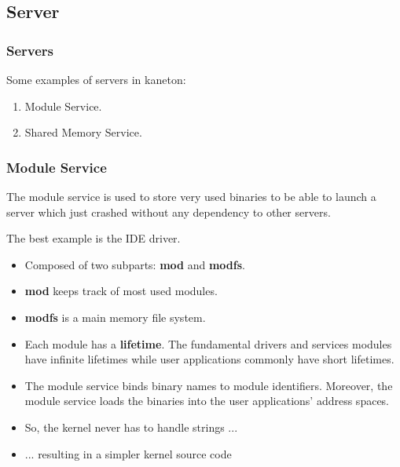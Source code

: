 %
%

\subsection{Server}


\begin{frame}
  \frametitle{Servers}

  Some examples of servers in kaneton:

  \begin{enumerate}[<+->]
    \item
      Module Service.
    \item
      Shared Memory Service.
  \end{enumerate}
\end{frame}


\begin{frame}
  \frametitle{Module Service}

  The module service is used to store very used binaries to be able to
  launch a server which just crashed without any dependency to other servers.

  \-

  The best example is the IDE driver.

  \-

  \begin{itemize}[<+->]
    \item
      Composed of two subparts: \textbf{mod} and \textbf{modfs}.
    \item
      \textbf{mod} keeps track of most used modules.
    \item
      \textbf{modfs} is a main memory file system.
    \item
      Each module has a \textbf{lifetime}. The fundamental drivers
      and services modules have infinite lifetimes while user applications
      commonly have short lifetimes.
    \item
      The module service binds binary names to module identifiers.
      Moreover, the module service loads the binaries into the
      user applications' address spaces.
    \item
      So, the kernel never has to handle strings ...
    \item
      ... resulting in a simpler kernel source code
  \end{itemize}
\end{frame}

